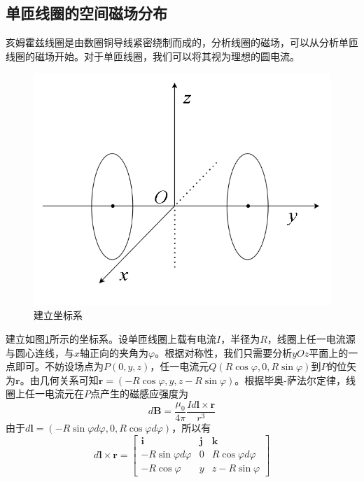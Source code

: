 \documentclass{ctexart}
\begin{document}
\begin{multicols}{2}
\subsection{单匝线圈的空间磁场分布}
亥姆霍兹线圈是由数圈铜导线紧密绕制而成的，分析线圈的磁场，可以从分析单匝线圈的磁场开始。对于单匝线圈，我们可以将其视为理想的圆电流。
\begin{figure}[H]
    \centering
    \includegraphics[scale=0.6]{./pic/坐标系.png}
    \caption{建立坐标系}
    \label{建立坐标系}
\end{figure}
建立如图\ref{建立坐标系}所示的坐标系。设单匝线圈上载有电流$I$，半径为$R$，线圈上任一电流源与圆心连线，与$x$轴正向的夹角为$\varphi$。根据对称性，我们只需要分析$yOz$平面上的一点即可。不妨设场点为$P(0,y,z)$，任一电流元$Q(R \cos \varphi,0,R \sin \varphi)$到$P$的位矢为$\bm{r}$。由几何关系可知$\bm{r}=(-R \cos \varphi,y,z-R \sin \varphi)$。根据毕奥-萨法尔定律，线圈上任一电流元在$P$点产生的磁感应强度为
\begin{equation}
    d\bm{B}=\dfrac{\mu_0}{4\pi}\dfrac{Id\bm{l}\times \bm{r}}{r^3}
\end{equation}
由于$d\bm{l}=(-R\sin \varphi d\varphi,0,R\cos \varphi d\varphi) $，所以有
\begin{equation}
    d\bm{l}\times \bm{r}
    =
    \begin{bmatrix}
       \bm{i} & \bm{j} &\bm{k}\\
       -R\sin \varphi d\varphi & 0 & R\cos \varphi d\varphi\\
       -R \cos \varphi & y & z-R \sin \varphi
    \end{bmatrix}

\end{equation}
\end{multicols}
\end{document}
